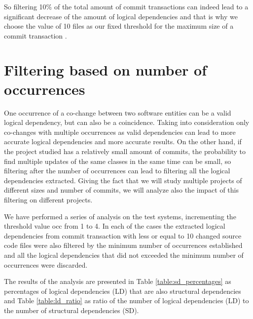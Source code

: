 \documentclass[12pt]{mitthesis}
\begin{document}
So filtering 10\% of the total amount of commit transactions can indeed lead to a significant decrease of the amount of logical dependencies and that is why we choose the value of 10 files as our fixed threshold for the maximum size of a commit transaction \cite{DepSACI}.



\section{Filtering based on number of occurrences}
\label{sec:filterocc}
One occurrence of a co-change between two software entities can be a valid logical dependency, but can also be a coincidence. Taking into consideration only co-changes with multiple occurrences as valid dependencies can lead to more accurate logical dependencies and more accurate results. On the other hand, if the project studied has a relatively small amount of commits, the probability to find multiple updates of the same classes in the same time can be small, so filtering after the number of occurrences can lead to filtering all the logical dependencies extracted. Giving the fact that we will study multiple projects of different sizes and number of commits, we will analyze also the impact of this filtering on different projects.

We have performed a series of analysis on the test systems, incrementing the threshold value occ from 1 to 4. In each of the cases the extracted logical dependencies from commit transaction with less or equal to 10 changed source code files were also filtered by the minimum number of occurrences established and all the logical dependencies that did not exceeded the minimum number of occurrences were discarded. 

The results of the analysis are presented in Table \ref{table:sd_percentages} as percentages of logical dependencies (LD) that are also structural dependencies and Table \ref{table:ld_ratio} as ratio of the number of logical dependencies (LD) to the number of structural dependencies (SD).
\end{document}
